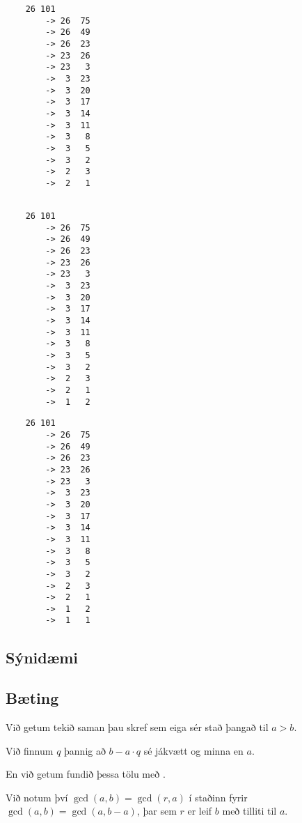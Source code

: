{ \begin{verbatim}
    26 101
        -> 26  75
        -> 26  49
        -> 26  23
        -> 23  26
        -> 23   3
        ->  3  23
        ->  3  20
        ->  3  17
        ->  3  14
        ->  3  11
        ->  3   8
        ->  3   5
        ->  3   2
        ->  2   3
        ->  2   1


        \end{verbatim}}
{ \begin{verbatim}
    26 101
        -> 26  75
        -> 26  49
        -> 26  23
        -> 23  26
        -> 23   3
        ->  3  23
        ->  3  20
        ->  3  17
        ->  3  14
        ->  3  11
        ->  3   8
        ->  3   5
        ->  3   2
        ->  2   3
        ->  2   1
        ->  1   2

        \end{verbatim}}
{ \begin{verbatim}
    26 101
        -> 26  75
        -> 26  49
        -> 26  23
        -> 23  26
        -> 23   3
        ->  3  23
        ->  3  20
        ->  3  17
        ->  3  14
        ->  3  11
        ->  3   8
        ->  3   5
        ->  3   2
        ->  2   3
        ->  2   1
        ->  1   2
        ->  1   1
        \end{verbatim}}

\subsection{Sýnidæmi}
{
}

\subsection{Bæting}
{
    {
        \item<1-> Við getum tekið saman þau skref sem eiga sér stað þangað til $a > b$.
        \item<2-> Við finnum $q$ þannig að $b - a \cdot q$ sé jákvætt og minna en $a$.
        \item<4-> En við getum fundið þessa tölu með .
        \item<5-> Við notum því $\gcd(a, b) = \gcd(r, a)$ í staðinn fyrir $\gcd(a, b) = \gcd(a, b - a)$, þar sem $r$ er leif $b$ með tilliti til $a$.
    }
}

